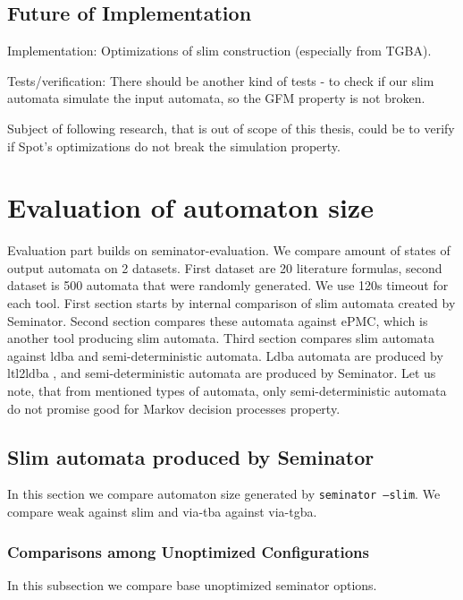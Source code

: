 \documentclass[
	digital,
nolof, nolot
]{fithesis3}
\begin{document}
	\section{Future of Implementation}
	Implementation:
	Optimizations of slim construction (especially from TGBA).
	
	
	
	Tests/verification:
	There should be another kind of tests - to check if our slim automata simulate the input automata, so the GFM property is not broken.
	
	Subject of following research, that is out of scope of this thesis, could be to verify if Spot's optimizations do not break the simulation property. 
	
	\chapter{Evaluation of automaton size}
	Evaluation part builds on seminator-evaluation. We compare amount of states of output automata on 2 datasets. First dataset are 20 literature formulas, second dataset is 500 automata that were randomly generated. We use 120s timeout for each tool. First section starts by internal comparison of slim automata created by Seminator. Second section compares these automata against ePMC, which is another tool producing slim automata. Third section compares slim automata against ldba and semi-deterministic automata. Ldba automata are produced by ltl2ldba \cite{ltl2ldba}, and semi-deterministic automata are produced by Seminator. Let us note, that from mentioned types of automata, only semi-deterministic automata do not promise good for Markov decision processes property.
	
	\section{Slim automata produced by Seminator}
	In this section we compare automaton size generated by \texttt{seminator --slim}.
	We compare weak against slim and via-tba against via-tgba.
	\subsection{Comparisons among Unoptimized Configurations}
	In this subsection we compare base unoptimized seminator options.
	
\end{document}

